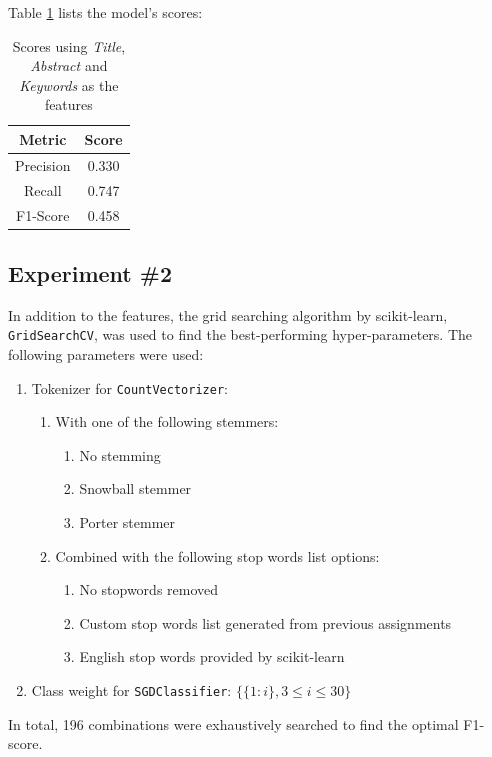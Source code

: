 \documentclass[11pt]{article}
\begin{document}
Table \ref{table:gs0_score} lists the model's scores:
\begin{table}[!ht]
    \caption{Scores using \textit{Title}, \textit{Abstract} and \textit{Keywords} as the features}
    \label{table:gs0_score}
    \begin{center}

        \begin{tabular}{| c | c |}
        \hline
        \textbf{Metric} & \textbf{Score}
        \\ \hline
        Precision & 0.330 
        \\ \hline
        Recall & 0.747
        \\ \hline
        F1-Score & 0.458
        \\ \hline
        \end{tabular}

    \end{center}

\end{table}

\subsection{Experiment \#2}
In addition to the features, the grid searching algorithm by scikit-learn, \texttt{GridSearchCV}, was used to find the best-performing hyper-parameters. The following parameters were used:
\begin{enumerate}
    \item Tokenizer for \texttt{CountVectorizer}:
    \begin{enumerate}
        \item With one of the following stemmers:
        \begin{enumerate}
            \item No stemming
            \item Snowball stemmer
            \item Porter stemmer
        \end{enumerate}
        \item Combined with the following stop words list options:
        \begin{enumerate}
            \item No stopwords removed
            \item Custom stop words list generated from previous assignments
            \item English stop words provided by scikit-learn
        \end{enumerate}
    \end{enumerate}
    \item Class weight for \texttt{SGDClassifier}: $\{\{1: i\}, 3 \le i \le 30\}$
\end{enumerate}
In total, 196 combinations were exhaustively searched to find the optimal F1-score.
\end{document}

